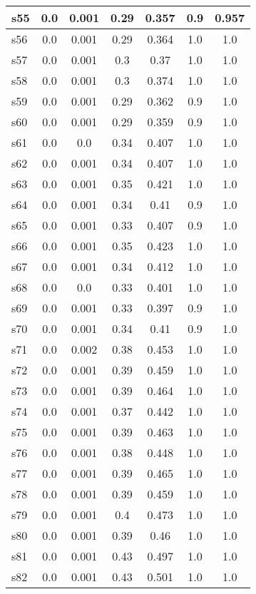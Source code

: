 \documentclass{article}
\begin{document}
\begin{tabular}{|l|c|c|c|c|c|c|}
\hline
s55 &0.0 & 0.001 & 0.29 & 0.357 & 0.9 & 0.957\\
\hline
s56 &0.0 & 0.001 & 0.29 & 0.364 & 1.0 & 1.0\\
\hline
s57 &0.0 & 0.001 & 0.3 & 0.37 & 1.0 & 1.0\\
\hline
s58 &0.0 & 0.001 & 0.3 & 0.374 & 1.0 & 1.0\\
\hline
s59 &0.0 & 0.001 & 0.29 & 0.362 & 0.9 & 1.0\\
\hline
s60 &0.0 & 0.001 & 0.29 & 0.359 & 0.9 & 1.0\\
\hline
s61 &0.0 & 0.0 & 0.34 & 0.407 & 1.0 & 1.0\\
\hline
s62 &0.0 & 0.001 & 0.34 & 0.407 & 1.0 & 1.0\\
\hline
s63 &0.0 & 0.001 & 0.35 & 0.421 & 1.0 & 1.0\\
\hline
s64 &0.0 & 0.001 & 0.34 & 0.41 & 0.9 & 1.0\\
\hline
s65 &0.0 & 0.001 & 0.33 & 0.407 & 0.9 & 1.0\\
\hline
s66 &0.0 & 0.001 & 0.35 & 0.423 & 1.0 & 1.0\\
\hline
s67 &0.0 & 0.001 & 0.34 & 0.412 & 1.0 & 1.0\\
\hline
s68 &0.0 & 0.0 & 0.33 & 0.401 & 1.0 & 1.0\\
\hline
s69 &0.0 & 0.001 & 0.33 & 0.397 & 0.9 & 1.0\\
\hline
s70 &0.0 & 0.001 & 0.34 & 0.41 & 0.9 & 1.0\\
\hline
s71 &0.0 & 0.002 & 0.38 & 0.453 & 1.0 & 1.0\\
\hline
s72 &0.0 & 0.001 & 0.39 & 0.459 & 1.0 & 1.0\\
\hline
s73 &0.0 & 0.001 & 0.39 & 0.464 & 1.0 & 1.0\\
\hline
s74 &0.0 & 0.001 & 0.37 & 0.442 & 1.0 & 1.0\\
\hline
s75 &0.0 & 0.001 & 0.39 & 0.463 & 1.0 & 1.0\\
\hline
s76 &0.0 & 0.001 & 0.38 & 0.448 & 1.0 & 1.0\\
\hline
s77 &0.0 & 0.001 & 0.39 & 0.465 & 1.0 & 1.0\\
\hline
s78 &0.0 & 0.001 & 0.39 & 0.459 & 1.0 & 1.0\\
\hline
s79 &0.0 & 0.001 & 0.4 & 0.473 & 1.0 & 1.0\\
\hline
s80 &0.0 & 0.001 & 0.39 & 0.46 & 1.0 & 1.0\\
\hline
s81 &0.0 & 0.001 & 0.43 & 0.497 & 1.0 & 1.0\\
\hline
s82 &0.0 & 0.001 & 0.43 & 0.501 & 1.0 & 1.0\\
\hline

\end{tabular}
\end{document}
